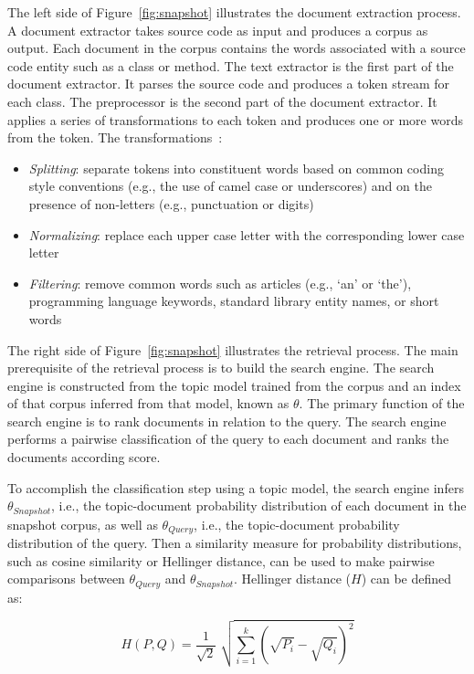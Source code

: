 The left side of Figure~\ref{fig:snapshot} illustrates the document extraction process.
A document extractor takes source code as input and produces a corpus as output.
Each document in the corpus contains the words associated with a source code entity
such as a class or method.
The text extractor is the first part of the document extractor.
It parses the source code and produces a token stream for each class.
The preprocessor is the second part of the document extractor.
It applies a series of transformations to each token and
produces one or more words from the token.
The transformations~\cite{Marcus-etal:2004,Marcus-Menzies:2010}: %
\begin{itemize}
    \item {\it Splitting}: separate tokens into constituent words
        based on common coding style conventions (e.g., the use of camel case or underscores)
        and on the presence of non-letters (e.g., punctuation or digits)
    \item {\it Normalizing}: replace each upper case letter with the corresponding lower case letter
    \item {\it Filtering}: remove common words such as articles (e.g., `an' or `the'),
        programming language keywords, standard library entity names, or short words
\end{itemize}

The right side of Figure~\ref{fig:snapshot} illustrates the retrieval process.
The main prerequisite of the retrieval process is to build the search engine.
The search engine is constructed from the topic model trained from the corpus
and an index of that corpus inferred from that model, known as $\theta$.
The primary function of the search engine is to rank documents in relation to the query.
The search engine performs a pairwise classification of the query
to each document and ranks the documents according score.

To accomplish the classification step using a topic model,
the search engine infers $\theta_{Snapshot}$, i.e.,
the topic-document probability distribution of each document in the snapshot corpus,
as well as $\theta_{Query}$, i.e., the topic-document probability distribution of the query.
Then a similarity measure for probability distributions, such as
cosine similarity or Hellinger distance, can be used to make pairwise comparisons
between $\theta_{Query}$ and $\theta_{Snapshot}$.
Hellinger distance ($H$) can be defined as:

\begin{equation}
    H(P, Q) = \frac{1}{\sqrt{2}} \; \sqrt{\sum_{i=1}^{k} (\sqrt{P_i} - \sqrt{Q_i})^2}
\end{equation}

